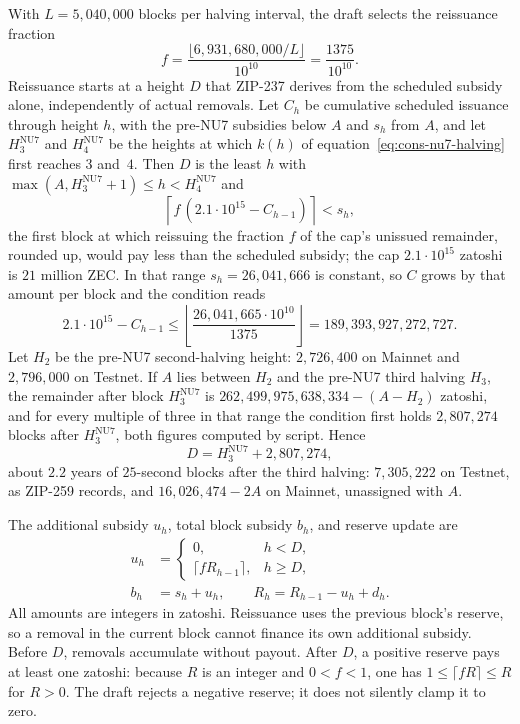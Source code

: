 \documentclass[11pt,a4paper]{article}
\theoremstyle{definition}
\begin{document}
With $L=5{,}040{,}000$ blocks per halving interval, the draft selects the
reissuance fraction
\[
 f=\frac{\lfloor6{,}931{,}680{,}000/L\rfloor}{10^{10}}
   =\frac{1375}{10^{10}}.
\]
Reissuance starts at a height $D$ that ZIP-237 derives from the scheduled
subsidy alone, independently of actual removals. Let $C_h$ be cumulative
scheduled issuance through height $h$, with the pre-NU7 subsidies below $A$
and $s_h$ from $A$, and let $H_3^{\mathrm{NU7}}$ and $H_4^{\mathrm{NU7}}$ be
the heights at which $k(h)$ of equation~\eqref{eq:cons-nu7-halving} first
reaches $3$ and~$4$. Then $D$ is the least $h$ with
$\max(A,H_3^{\mathrm{NU7}}+1)\leq h<H_4^{\mathrm{NU7}}$ and
\[
 \left\lceil f\,(2.1\cdot10^{15}-C_{h-1})\right\rceil<s_h,
\]
the first block at which reissuing the fraction $f$ of the cap's unissued
remainder, rounded up, would pay less than the scheduled subsidy; the cap
$2.1\cdot10^{15}$ zatoshi is $21$ million ZEC. In that range
$s_h=26{,}041{,}666$ is constant, so $C$ grows by that amount per block and
the condition reads
\[
 2.1\cdot10^{15}-C_{h-1}\leq
 \left\lfloor\frac{26{,}041{,}665\cdot10^{10}}{1375}\right\rfloor
 =189{,}393{,}927{,}272{,}727.
\]
Let $H_2$ be the pre-NU7 second-halving height: $2{,}726{,}400$ on Mainnet
and $2{,}796{,}000$ on Testnet. If $A$ lies between $H_2$ and the pre-NU7
third halving $H_3$, the remainder after block $H_3^{\mathrm{NU7}}$ is
$262{,}499{,}975{,}638{,}334-(A-H_2)$ zatoshi, and for every multiple of
three in that range the condition first holds $2{,}807{,}274$ blocks after
$H_3^{\mathrm{NU7}}$, both figures computed by script. Hence
\[
 D=H_3^{\mathrm{NU7}}+2{,}807{,}274,
\]
about $2.2$ years of $25$-second blocks after the third halving:
$7{,}305{,}222$ on Testnet, as ZIP-259 records, and $16{,}026{,}474-2A$ on
Mainnet, unassigned with $A$.

The additional subsidy $u_h$, total block subsidy $b_h$, and reserve update
are
\begin{align}
 u_h&=\begin{cases}0,&h<D,\\
       \lceil f R_{h-1}\rceil,&h\geq D,\end{cases}
       \label{eq:cons-nu7-extra}\\
 b_h&=s_h+u_h,\qquad
 R_h=R_{h-1}-u_h+d_h.\label{eq:cons-nu7-reserve}
\end{align}
All amounts are integers in zatoshi. Reissuance uses the previous block's
reserve, so a removal in the current block cannot finance its own
additional subsidy. Before $D$, removals accumulate without payout. After
$D$, a positive reserve pays at least one zatoshi: because $R$ is an
integer and $0<f<1$, one has $1\leq\lceil fR\rceil\leq R$ for $R>0$.
The draft rejects a negative reserve; it does not silently clamp it to zero.
\end{document}
